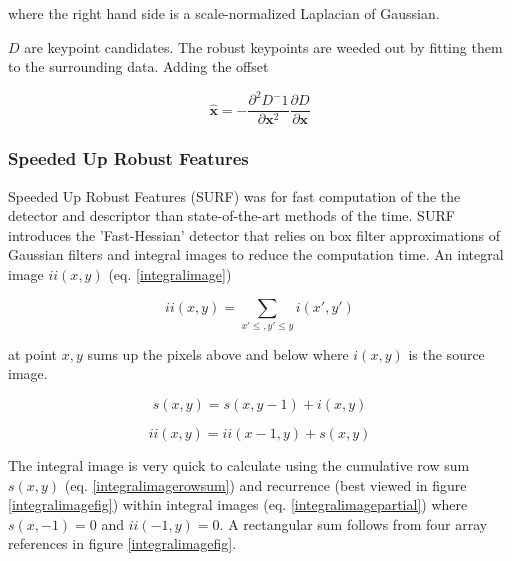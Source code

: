 \documentclass[english,12pt,a4paper,pdftex,elec,utf8, table]{aaltothesis}
\begin{document}
where the right hand side is a scale-normalized Laplacian of Gaussian.

$D$ are keypoint candidates. The robust keypoints are weeded out by fitting them to the surrounding data. \cite{Lowe2004} Adding the offset

\begin{equation}\label{keypointoffset}
\hat{\boldsymbol{x}} = - \frac{\partial^2D^-1}{\partial \boldsymbol{x}^2}\frac{\partial D}{\partial \boldsymbol{x}}
\end{equation}\cite{Lowe2004}

\subsubsection{Speeded Up Robust Features}
Speeded Up Robust Features (SURF) was for fast computation of the the detector and descriptor than state-of-the-art methods of the time. SURF introduces the 'Fast-Hessian' detector that relies on box filter approximations of Gaussian filters and integral images to reduce the computation time. \cite{Bay2006} An integral image $ii(x,y)$ (eq. \ref{integralimage})

\begin{equation}
  \label{integralimage}
ii(x,y) = \sum\limits_{x'\le,y'\le y} i(x', y')
\end{equation}

at point $x, y$ sums up the pixels above and below where $i(x,y)$ is the source image. \cite{Viola2001}

\begin{equation}
  \label{integralimagerowsum}
s(x,y) = s(x, y - 1) + i(x,y)
\end{equation}

\begin{equation}
  \label{integralimagepartial}
  ii(x,y) = ii(x-1,y) + s(x,y)
\end{equation}

The integral image is very quick to calculate using the cumulative row sum $s(x,y)$ (eq. \ref{integralimagerowsum}) and recurrence (best viewed in figure \ref{integralimagefig}) within integral images (eq. \ref{integralimagepartial}) where $s(x, -1) = 0$ and $ii(-1,y)=0$. A rectangular sum follows from four array references in figure \ref{integralimagefig}.
\end{document}
